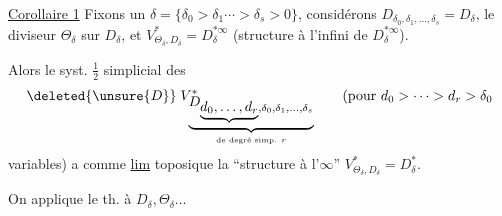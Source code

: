 \uline{Corollaire 1} Fixons un $\delta=\{\delta_0>\delta_1\cdots>\delta_s>0\}$,
considérons $D_{\delta_0,\delta_1,\ldots,\delta_s}=D_\delta$, le diviseur
$\Theta_\delta$ sur $D_\delta$, et $V^*_{\Theta_\delta,D_\delta}=D_\delta^{*\infty}$
(structure à l'infini de $D_\delta^{*\infty}$).

Alors le syst. $\frac12$ simplicial des
\[
\deleted{\unsure{D}}\;V^*_{\underbrace{D_{\underbrace{d_0,\ldots,d_r},\delta_0,\delta_1,\ldots,\delta_s}}_{\text{de degré simp. }r}}
\qquad(\text{pour }d_0>\cdots>d_r>\delta_0
\]
variables) a comme \uline{lim} toposique
la ``structure à l'$\infty$'' $V^*_{\Theta_\delta,D_\delta}=D_\delta^*$.

On applique le th. à $D_\delta,\Theta_\delta\ldots$

